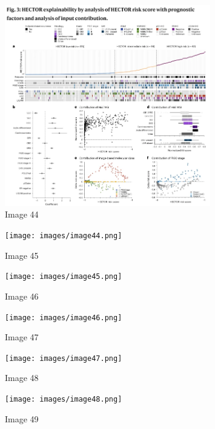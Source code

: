 \documentclass{article}%
\begin{document}
%


\begin{figure}[h!]%
\centering%
\includegraphics[width=0.8\textwidth]{images/image43.png}%
\caption{Image 44}%
\end{figure}

%


\begin{figure}[h!]%
\centering%
\texttt{[image: images/image44.png]}%
\caption{Image 45}%
\end{figure}

%


\begin{figure}[h!]%
\centering%
\texttt{[image: images/image45.png]}%
\caption{Image 46}%
\end{figure}

%


\begin{figure}[h!]%
\centering%
\texttt{[image: images/image46.png]}%
\caption{Image 47}%
\end{figure}

%


\begin{figure}[h!]%
\centering%
\texttt{[image: images/image47.png]}%
\caption{Image 48}%
\end{figure}

%


\begin{figure}[h!]%
\centering%
\texttt{[image: images/image48.png]}%
\caption{Image 49}%
\end{figure}

%
\end{document}
